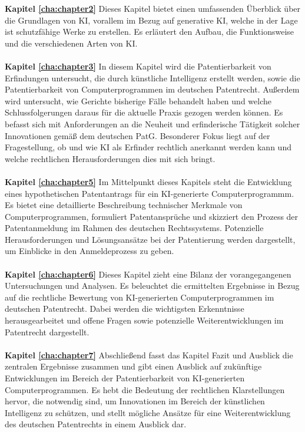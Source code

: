 \textbf{Kapitel \ref{cha:chapter2}} 
Dieses Kapitel bietet einen umfassenden Überblick über die Grundlagen
von KI, vorallem im Bezug auf generative KI, welche in der
Lage ist schutzfähige Werke zu erstellen.
Es erläutert den Aufbau, 
die Funktionsweise und die verschiedenen Arten von KI.
\\
\\
\textbf{Kapitel \ref{cha:chapter3}} 
In diesem Kapitel wird die Patentierbarkeit von Erfindungen untersucht,
die durch künstliche Intelligenz erstellt werden, 
sowie die Patentierbarkeit von Computerprogrammen im deutschen Patentrecht. 
Außerdem wird untersucht, wie Gerichte bisherige Fälle behandelt haben 
und welche Schlussfolgerungen daraus für die aktuelle Praxis gezogen werden können. 
Es befasst sich mit Anforderungen an die Neuheit 
und erfinderische Tätigkeit solcher Innovationen gemäß dem deutschen PatG. 
Besonderer Fokus liegt auf der Fragestellung, 
ob und wie KI als Erfinder rechtlich anerkannt werden kann 
und welche rechtlichen Herausforderungen dies mit sich bringt.
\\
\\
\textbf{Kapitel \ref{cha:chapter5}} 
Im Mittelpunkt dieses Kapitels steht die Entwicklung eines hypothetischen Patentantrags 
für ein KI-generierte Computerprogrammm. 
Es bietet eine detaillierte Beschreibung technischer Merkmale von Computerprogrammen, 
formuliert Patentansprüche und 
skizziert den Prozess der Patentanmeldung im Rahmen des deutschen Rechtssystems. 
Potenzielle Herausforderungen und Lösungsansätze bei der Patentierung werden dargestellt, 
um Einblicke in den Anmeldeprozess zu geben.
\\
\\
\textbf{Kapitel \ref{cha:chapter6}} 
Dieses Kapitel zieht eine Bilanz der vorangegangenen Untersuchungen und Analysen. 
Es beleuchtet die ermittelten Ergebnisse in Bezug auf die rechtliche Bewertung 
von KI-generierten Computerprogrammen im deutschen Patentrecht. 
Dabei werden die wichtigsten Erkenntnisse herausgearbeitet 
und offene Fragen sowie potenzielle Weiterentwicklungen im Patentrecht dargestellt.
\\
\\
\textbf{Kapitel \ref{cha:chapter7}} 
Abschließend fasst das Kapitel Fazit und Ausblick die zentralen Ergebnisse zusammen 
und gibt einen Ausblick auf zukünftige Entwicklungen im Bereich der Patentierbarkeit 
von KI-generierten Computerprogrammen. 
Es hebt die Bedeutung der rechtlichen Klarstellungen hervor, 
die notwendig sind, um Innovationen im Bereich der künstlichen Intelligenz zu schützen, 
und stellt mögliche Ansätze für eine Weiterentwicklung des deutschen Patentrechts 
in einem Ausblick dar.